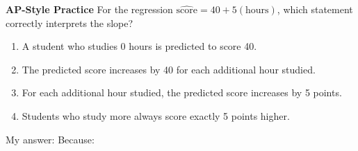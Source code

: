 \documentclass[10pt]{article}
\begin{document}
\begin{tcolorbox}[colback=redbg, colframe=redacc, boxrule=0.8pt, arc=2mm,
    left=4mm, right=4mm, top=2.5mm, bottom=2.5mm]
\small\textbf{AP-Style Practice}\enspace
For the regression $\widehat{\text{score}} = 40 + 5(\text{hours})$, which statement correctly
interprets the slope?

\vspace{7pt}
\begin{enumerate}[label=\textbf{(\Alph*)}, leftmargin=2em, itemsep=4pt]
  \item A student who studies 0 hours is predicted to score 40.
  \item The predicted score increases by 40 for each additional hour studied.
  \item For each additional hour studied, the predicted score increases by 5 points.
  \item Students who study more always score exactly 5 points higher.
\end{enumerate}
\end{tcolorbox}

\vspace{0.08in}
\noindent\textcolor{slate}{\small My answer: \blank{1cm} \quad Because: \blank{8.5cm}}
\end{document}
